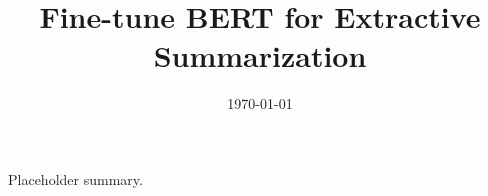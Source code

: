 \documentclass[12pt]{article}
\title{Fine-tune BERT for Extractive Summarization}
\date{\today}
\begin{document}
\maketitle

Placeholder summary.
\end{document}
